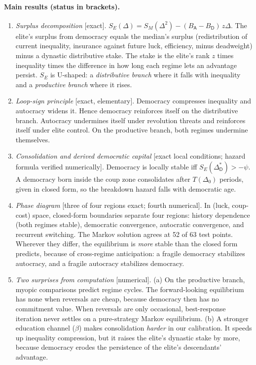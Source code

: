 \documentclass[11pt]{article}
\theoremstyle{remark}
\newcommand{\A}{\mathsf{A}}
\newcommand{\D}{\mathsf{D}}
\begin{document}
\paragraph{Main results (status in brackets).}
\begin{enumerate}
\item \emph{Surplus decomposition} [exact].  $S_E(\Delta)=S_M(\Delta^2)-(B_\A-B_\D)\,z\Delta$.  The elite's surplus from democracy equals the median's surplus (redistribution of current inequality, insurance against future luck, efficiency, minus deadweight) minus a dynastic distributive stake.  The stake is the elite's rank $z$ times inequality times the difference in how long each regime lets an advantage persist.  $S_E$ is U-shaped: a \emph{distributive branch} where it falls with inequality and a \emph{productive branch} where it rises.
\item \emph{Loop-sign principle} [exact, elementary].  Democracy compresses inequality and autocracy widens it.  Hence democracy reinforces itself on the distributive branch.  Autocracy undermines itself under revolution threats and reinforces itself under elite control.  On the productive branch, both regimes undermine themselves.
\item \emph{Consolidation and derived democratic capital} [exact local conditions; hazard formula verified numerically].  Democracy is locally stable iff $S_E(\Delta^*_\D)>-\psi$.  A democracy born inside the coup zone consolidates after $T(\Delta_0)$ periods, given in closed form, so the breakdown hazard falls with democratic age.
\item \emph{Phase diagram} [three of four regions exact; fourth numerical].  In (luck, coup-cost) space, closed-form boundaries separate four regions: history dependence (both regimes stable), democratic convergence, autocratic convergence, and recurrent switching.  The Markov solution agrees at 52 of 63 test points.  Wherever they differ, the equilibrium is \emph{more} stable than the closed form predicts, because of cross-regime anticipation: a fragile democracy stabilizes autocracy, and a fragile autocracy stabilizes democracy.
\item \emph{Two surprises from computation} [numerical].  (a) On the productive branch, myopic comparisons predict regime cycles.  The forward-looking equilibrium has none when reversals are cheap, because democracy then has no commitment value.  When reversals are only occasional, best-response iteration never settles on a pure-strategy Markov equilibrium.  (b) A stronger education channel ($\beta$) makes consolidation \emph{harder} in our calibration.  It speeds up inequality compression, but it raises the elite's dynastic stake by more, because democracy erodes the persistence of the elite's descendants' advantage.
\end{enumerate}
\end{document}
